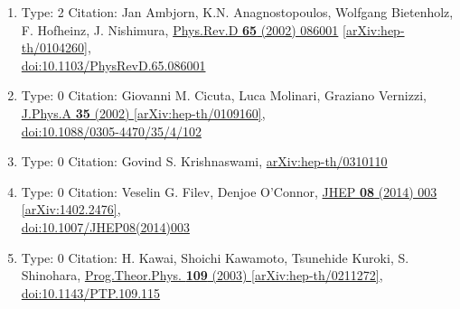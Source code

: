 \documentclass[a4paper,10pt]{article}
\begin{document}
\begin{enumerate}
\begin{enumerate}
  \item Type: 2 Citation: Jan Ambjorn, K.N. Anagnostopoulos, Wolfgang Bietenholz, F. Hofheinz, J. Nishimura, \href{https://www.doi.org/10.1103/PhysRevD.65.086001}{Phys.Rev.D {\bf 65} (2002) 086001}  \href{https://arxiv.org/abs/hep-th/0104260}{[arXiv:hep-th/0104260]},\\\href{https://www.doi.org/10.1103/PhysRevD.65.086001}{doi:10.1103/PhysRevD.65.086001}
  \item Type: 0 Citation: Giovanni M. Cicuta, Luca Molinari, Graziano Vernizzi, \href{https://www.doi.org/10.1088/0305-4470/35/4/102}{J.Phys.A {\bf 35} (2002) }  \href{https://arxiv.org/abs/hep-th/0109160}{[arXiv:hep-th/0109160]},\\\href{https://www.doi.org/10.1088/0305-4470/35/4/102}{doi:10.1088/0305-4470/35/4/102}
  \item Type: 0 Citation: Govind S. Krishnaswami, \href{https://arxiv.org/abs/hep-th/0310110}{arXiv:hep-th/0310110}
  \item Type: 0 Citation: Veselin G. Filev, Denjoe O'Connor, \href{https://www.doi.org/10.1007/JHEP08(2014)003}{JHEP {\bf 08} (2014) 003}  \href{https://arxiv.org/abs/1402.2476}{[arXiv:1402.2476]},\\\href{https://www.doi.org/10.1007/JHEP08(2014)003}{doi:10.1007/JHEP08(2014)003}
  \item Type: 0 Citation: H. Kawai, Shoichi Kawamoto, Tsunehide Kuroki, S. Shinohara, \href{https://www.doi.org/10.1143/PTP.109.115}{Prog.Theor.Phys. {\bf 109} (2003) }  \href{https://arxiv.org/abs/hep-th/0211272}{[arXiv:hep-th/0211272]},\\\href{https://www.doi.org/10.1143/PTP.109.115}{doi:10.1143/PTP.109.115}

\end{enumerate}
\end{enumerate}
\end{document}

